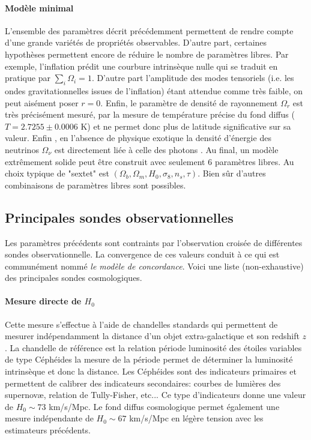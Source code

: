 \paragraph{Modèle minimal} L'ensemble des paramètres décrit précédemment permettent de rendre compte d'une grande variétés de propriétés observables. D'autre part, certaines hypothèses permettent encore de réduire le nombre de paramètres libres. Par exemple, l'inflation prédit une courbure intrinsèque nulle qui se traduit en pratique par $\sum_i \Omega_i=1$. D'autre part l'amplitude des modes tensoriels (i.e. les ondes gravitationnelles issues de l'inflation) étant attendue comme très faible, on peut aisément poser $r=0$. Enfin, le paramètre de densité de rayonnement $\Omega_r$ est très précisément mesuré, par la mesure de température précise du fond diffus ($T=2.7255\pm0.0006$ K) et ne permet donc plus de latitude significative sur sa valeur. Enfin , en l'absence de physique exotique la densité d'énergie des neutrinos $\Omega_\nu$ est directement liée à celle des photons . Au final, un modèle extrêmement solide peut être construit avec seulement 6 paramètres libres. Au choix typique de "sextet" est $(\Omega_b,\Omega_m, H_0,\sigma_8,n_s,\tau)$. Bien sûr d'autres combinaisons de paramètres libres sont possibles.

\subsection{Principales sondes observationnelles}

Les paramètres précédents sont contraints par l'observation croisée de différentes sondes observationnelle. La convergence de ces valeurs conduit à ce qui est communément nommé \textit{le modèle de concordance}. Voici une liste (non-exhaustive) des principales sondes cosmologiques.

\paragraph{Mesure directe de $H_0$}
Cette mesure s'effectue à l'aide de chandelles standards qui permettent de mesurer indépendamment la distance d'un objet extra-galactique et son redshift $z$. La chandelle de référence est la relation période luminosité des étoiles variables de type Céphéides la mesure de la période permet de déterminer la luminosité intrinsèque et donc la distance. Les Céphéides sont des indicateurs primaires et permettent de calibrer des indicateurs secondaires: courbes de lumières des supernovæ, relation de Tully-Fisher, etc... Ce type d'indicateurs donne une valeur de $H_0\sim 73$ km/s/Mpc. Le fond diffus cosmologique permet également une mesure indépendante de $H_0\sim 67$ km/s/Mpc en légère tension avec les estimateurs précédents.

